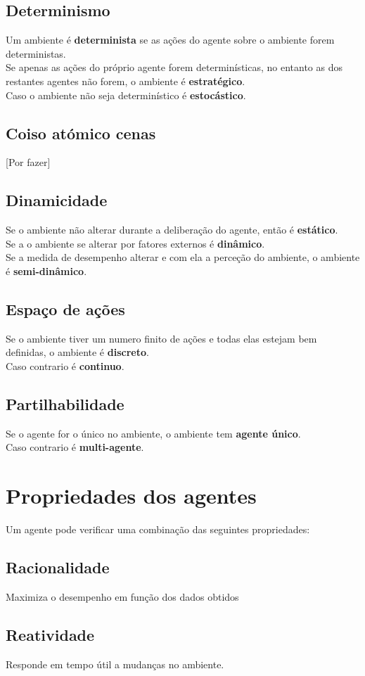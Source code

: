 \documentclass[]{report}
\begin{document}
\subsection{Determinismo}
Um ambiente é \textbf{determinista} se as ações do agente sobre o ambiente forem deterministas.\\
Se apenas as ações do próprio agente forem determinísticas, no entanto as dos restantes agentes não forem, o ambiente é \textbf{estratégico}.\\
Caso o ambiente não seja determinístico é \textbf{estocástico}.
\subsection{Coiso atómico cenas}
[Por fazer]
\subsection{Dinamicidade}
Se o ambiente não alterar durante a deliberação do agente, então é \textbf{estático}.\\
Se a o ambiente se alterar por fatores externos é \textbf{dinâmico}.\\
Se a medida de desempenho alterar e com ela a perceção do ambiente, o ambiente é \textbf{semi-dinâmico}.
\subsection{Espaço de ações}
Se o ambiente tiver um numero finito de ações e todas elas estejam bem definidas, o ambiente é \textbf{discreto}.\\
Caso contrario é \textbf{continuo}.
\subsection{Partilhabilidade}
Se o agente for o único no ambiente, o ambiente tem \textbf{agente único}.\\
Caso contrario é \textbf{multi-agente}.
\clearpage
\section{Propriedades dos agentes}
Um agente pode verificar uma combinação das seguintes propriedades:
\subsection{Racionalidade}
Maximiza o desempenho em função dos dados obtidos
\subsection{Reatividade}
Responde em tempo útil a mudanças no ambiente.
\end{document}
